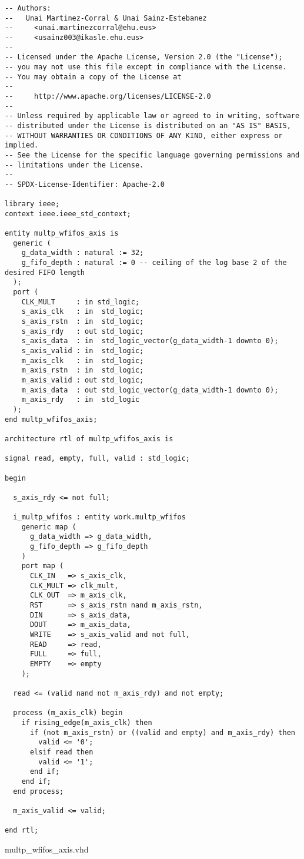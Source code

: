 \begin{code}
\begin{verbatim}
-- Authors:
--   Unai Martinez-Corral & Unai Sainz-Estebanez
--     <unai.martinezcorral@ehu.eus>
--     <usainz003@ikasle.ehu.eus>
--
-- Licensed under the Apache License, Version 2.0 (the "License");
-- you may not use this file except in compliance with the License.
-- You may obtain a copy of the License at
--
--     http://www.apache.org/licenses/LICENSE-2.0
--
-- Unless required by applicable law or agreed to in writing, software
-- distributed under the License is distributed on an "AS IS" BASIS,
-- WITHOUT WARRANTIES OR CONDITIONS OF ANY KIND, either express or implied.
-- See the License for the specific language governing permissions and
-- limitations under the License.
--
-- SPDX-License-Identifier: Apache-2.0

library ieee;
context ieee.ieee_std_context;

entity multp_wfifos_axis is
  generic (
    g_data_width : natural := 32;
    g_fifo_depth : natural := 0 -- ceiling of the log base 2 of the desired FIFO length
  );
  port (
    CLK_MULT     : in std_logic;
    s_axis_clk   : in  std_logic;
    s_axis_rstn  : in  std_logic;
    s_axis_rdy   : out std_logic;
    s_axis_data  : in  std_logic_vector(g_data_width-1 downto 0);
    s_axis_valid : in  std_logic;
    m_axis_clk   : in  std_logic;
    m_axis_rstn  : in  std_logic;
    m_axis_valid : out std_logic;
    m_axis_data  : out std_logic_vector(g_data_width-1 downto 0);
    m_axis_rdy   : in  std_logic
  );
end multp_wfifos_axis;

architecture rtl of multp_wfifos_axis is

signal read, empty, full, valid : std_logic;

begin

  s_axis_rdy <= not full;

  i_multp_wfifos : entity work.multp_wfifos
    generic map (
      g_data_width => g_data_width,
      g_fifo_depth => g_fifo_depth
    )
    port map (
      CLK_IN   => s_axis_clk,
      CLK_MULT => clk_mult,
      CLK_OUT  => m_axis_clk,
      RST      => s_axis_rstn nand m_axis_rstn,
      DIN      => s_axis_data,
      DOUT     => m_axis_data,
      WRITE    => s_axis_valid and not full,
      READ     => read,
      FULL     => full,
      EMPTY    => empty
    );

  read <= (valid nand not m_axis_rdy) and not empty;

  process (m_axis_clk) begin
    if rising_edge(m_axis_clk) then
      if (not m_axis_rstn) or ((valid and empty) and m_axis_rdy) then
        valid <= '0';
      elsif read then
        valid <= '1';
      end if;
    end if;
  end process;

  m_axis_valid <= valid;

end rtl;
\end{verbatim}
\caption{multp\_wfifos\_axis.vhd}
\label{ap-cod:8}
\end{code}

